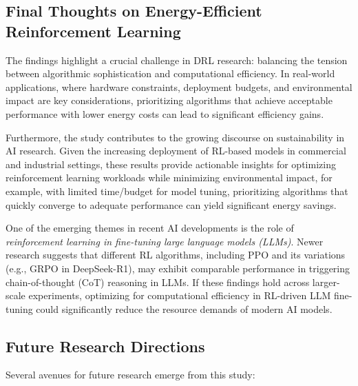 \subsection{Final Thoughts on Energy-Efficient Reinforcement Learning}
\label{subsec:final_thoughts_energy_eff}
The findings highlight a crucial challenge in DRL research: balancing the tension between algorithmic sophistication and computational efficiency. In real-world applications, where hardware constraints, deployment budgets, and environmental impact are key considerations, prioritizing algorithms that achieve acceptable performance with lower energy costs can lead to significant efficiency gains.

Furthermore, the study contributes to the growing discourse on sustainability in AI research. Given the increasing deployment of RL-based models in commercial and industrial settings, these results provide actionable insights for optimizing reinforcement learning workloads while minimizing environmental impact, for example, with limited time/budget for model tuning, prioritizing algorithms that quickly converge to adequate performance can yield significant energy savings.

One of the emerging themes in recent AI developments is the role of \emph{reinforcement learning in fine-tuning large language models (LLMs)}. Newer research suggests that different RL algorithms, including PPO and its variations (e.g., GRPO in DeepSeek-R1), may exhibit comparable performance in triggering chain-of-thought (CoT) reasoning in LLMs. If these findings hold across larger-scale experiments, optimizing for computational efficiency in RL-driven LLM fine-tuning could significantly reduce the resource demands of modern AI models.

\subsection{Future Research Directions}
\label{subsec:future_research}
Several avenues for future research emerge from this study:

